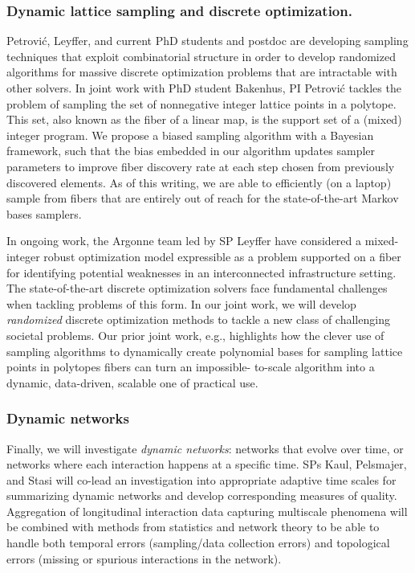 \documentclass[11pt]{NSFamsart}
\begin{document}
 \subsubsection*{Dynamic lattice sampling and discrete optimization.} 
 Petrovi\'c, Leyffer, and current PhD students and postdoc are developing sampling techniques that exploit combinatorial structure in order to develop randomized algorithms for massive discrete optimization problems that are intractable with other solvers. In joint work with PhD student Bakenhus, PI Petrovi\'c tackles the problem of sampling the set of nonnegative integer lattice points in a polytope. This set, also known as the fiber of a linear map, is the support set of a (mixed) integer program. We propose a biased sampling algorithm with a Bayesian framework, such that  the bias embedded in our algorithm updates sampler parameters to improve fiber discovery rate at each step chosen from previously discovered elements. As of this writing, we are able to efficiently (on a laptop) sample from fibers that are entirely out of reach for the state-of-the-art Markov bases samplers. 

In ongoing work, the Argonne team led by SP Leyffer have considered a mixed-integer robust optimization model expressible as a problem supported on a fiber  for identifying potential weaknesses in an interconnected infrastructure setting.  The state-of-the-art discrete optimization solvers face fundamental challenges when tackling problems of this form. In our joint work, we will develop \emph{randomized} discrete optimization methods to tackle a new class of challenging societal problems. Our prior joint work, e.g., \cite{PShypergraphs}  highlights how the clever use of sampling algorithms to dynamically create polynomial bases for sampling lattice points in polytopes fibers can turn an impossible- to-scale algorithm into a dynamic, data-driven, scalable one of practical use.


\subsubsection*{Dynamic networks}
Finally, we will investigate {\it dynamic networks}: networks that evolve over time, or networks where each interaction happens at a specific time.  
SPs Kaul, Pelsmajer, and Stasi will co-lead an  investigation into appropriate adaptive time scales  for summarizing dynamic networks and develop corresponding measures of quality. 
Aggregation of longitudinal interaction data capturing multiscale phenomena will be combined with methods from statistics and network theory to be able to handle both temporal errors (sampling/data collection errors) and topological errors (missing or spurious interactions in the network).
\end{document}
